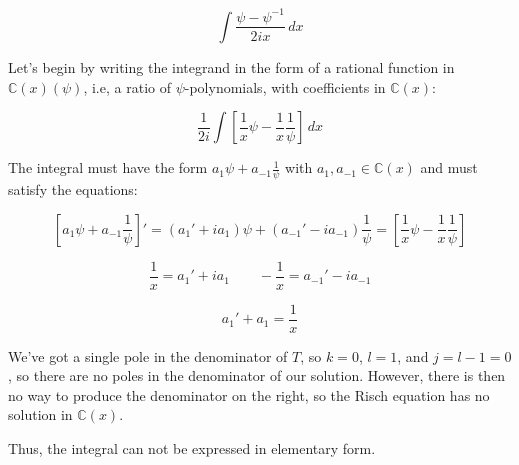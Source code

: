 $$\int \frac{\psi - \psi^{-1}}{2ix} \,dx$$

Let's begin by writing the integrand in the form of a rational
function in ${\mathbb C}(x)(\psi)$, i.e, a ratio
of $\psi$-polynomials, with coefficients in ${\mathbb C}(x)$:

$$\frac{1}{2i} \int \left[ \frac{1}{x}\psi - \frac{1}{x}\frac{1}{\psi} \right]\,dx$$

\begin{comment}
We want to split the denominator into its normal and special
components, by factoring it into irreducible polynomials and
classifying each one as normal or special.  In this case, the
factoriziation is trivial, and we know from theorem \ref{basic
exponential properties} that $\psi$ is special.

Can we have any logarithms in our integral?  Let's see.
Any logarithm of a rational function can be factored and
split into separate logarithms using basic properties
of a logarithms:

$$\ln ab = \ln a + \ln b \qquad\qquad \ln\frac{a}{b} = \ln a - \ln b$$

So, we need only consider logarithms of irreducible polynomials.

Theorem \ref{basic exponential properties} also tells us that we can
have no normal polynomials in denominator of our integral,
\end{comment}


The integral must have the form $a_1 \psi + a_{-1} \frac{1}{\psi}$
with $a_1, a_{-1} \in {\mathbb C}(x)$ and must satisfy the equations:

$$\left[ a_1 \psi + a_{-1}\frac{1}{\psi} \right]' = (a_1' + i a_1 ) \psi + (a_{-1}' - i a_{-1} ) \frac{1}{\psi}
= \left[ \frac{1}{x}\psi - \frac{1}{x}\frac{1}{\psi} \right]$$

$$\frac{1}{x} = a_1' + i a_1 \qquad - \frac{1}{x} = a_{-1}' - i a_{-1}$$

$$a_1' + a_1 = \frac{1}{x}$$

We've got a single pole in the denominator of $T$, so $k=0$, $l=1$,
and $j=l-1=0$, so there are no poles in the denominator of our solution.
However, there is then no way to produce the denominator on the
right, so the Risch equation has no solution in ${\mathbb C}(x)$.


Thus, the integral can not be expressed in elementary form.

\endexample

\vfil\eject

